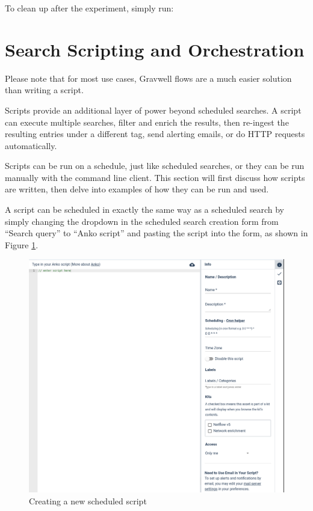 To clean up after the experiment, simply run:




\section{Search Scripting and Orchestration}
\begin{large}
Please note that for most use cases, Gravwell flows are a much easier solution than writing a script.
\end{large}

Scripts provide an additional layer of power beyond scheduled
searches. A script can execute multiple searches, filter and enrich the
results, then re-ingest the resulting entries under a different tag,
send alerting emails, or do HTTP requests automatically.

Scripts can be run on a schedule, just like scheduled searches, or they
can be run manually with the command line client. This section will
first discuss how scripts are written, then delve into examples of how
they can be run and used.

A script can be scheduled in exactly the same way as a scheduled search
by simply changing the dropdown in the scheduled search creation form
from ``Search query'' to ``Anko script'' and pasting the script into the
form, as shown in Figure \ref{fig:create-soar}.

\begin{figure}
	\includegraphics{images/create-soar.png}
	\caption{Creating a new scheduled script}
	\label{fig:create-soar}
\end{figure}

